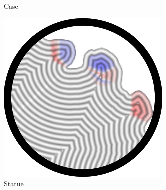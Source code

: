 \begin{figure}
\begin{subfigure}[t]{\figwidth}
\caption{Case}\label{applications_case}
\end{subfigure}
\begin{subfigure}[t]{\figwidth}\centering
\includegraphics[height=\figheight]{sources-applications-david.png}
\caption{Statue}\label{applications_statue}
\end{subfigure}
\begin{subfigure}[t]{\figwidth}\centering
{}
\caption{}\label{applications_tud}
\end{subfigure}
\begin{subfigure}[t]{\figwidth}\centering
{}
\end{subfigure}
\end{figure}
